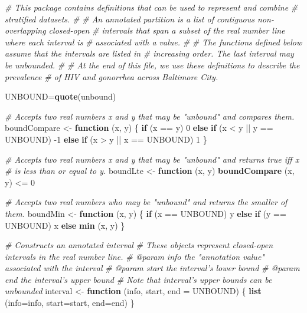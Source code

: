 \documentclass[]{article}
\newenvironment{Shaded}{}{}
\newcommand{\CommentTok}[1]{\textcolor[rgb]{0.38,0.63,0.69}{\textit{#1}}}
\newcommand{\ControlFlowTok}[1]{\textcolor[rgb]{0.00,0.44,0.13}{\textbf{#1}}}
\newcommand{\DataTypeTok}[1]{\textcolor[rgb]{0.56,0.13,0.00}{#1}}
\newcommand{\DecValTok}[1]{\textcolor[rgb]{0.25,0.63,0.44}{#1}}
\newcommand{\KeywordTok}[1]{\textcolor[rgb]{0.00,0.44,0.13}{\textbf{#1}}}
\newcommand{\NormalTok}[1]{#1}
\newcommand{\OperatorTok}[1]{\textcolor[rgb]{0.40,0.40,0.40}{#1}}
\newcommand{\StringTok}[1]{\textcolor[rgb]{0.25,0.44,0.63}{#1}}
\begin{document}
\begin{Shaded}
\begin{Highlighting}[]
\CommentTok{# This package contains definitions that can be used to represent and combine}
\CommentTok{# stratified datasets.}
\CommentTok{#}
\CommentTok{# An annotated partition is a list of contiguous non-overlapping closed-open}
\CommentTok{# intervals that span a subset of the real number line where each interval is}
\CommentTok{# associated with a value.}
\CommentTok{#}
\CommentTok{# The functions defined below assume that the intervals are listed in}
\CommentTok{# increasing order. The last interval may be unbounded.}
\CommentTok{#}
\CommentTok{# At the end of this file, we use these definitions to describe the prevalence}
\CommentTok{# of HIV and gonorrhea across Baltimore City.}

\NormalTok{UNBOUND=}\KeywordTok{quote}\NormalTok{(unbound)}

\CommentTok{# Accepts two real numbers x and y that may be "unbound" and compares them.}
\NormalTok{boundCompare <-}\StringTok{ }\ControlFlowTok{function}\NormalTok{ (x, y) \{}
  \ControlFlowTok{if}\NormalTok{ (x }\OperatorTok{==}\StringTok{ }\NormalTok{y) }\DecValTok{0}
  \ControlFlowTok{else} \ControlFlowTok{if}\NormalTok{ (x }\OperatorTok{<}\StringTok{ }\NormalTok{y }\OperatorTok{||}\StringTok{ }\NormalTok{y }\OperatorTok{==}\StringTok{ }\NormalTok{UNBOUND) }\DecValTok{-1}
  \ControlFlowTok{else} \ControlFlowTok{if}\NormalTok{ (x }\OperatorTok{>}\StringTok{ }\NormalTok{y }\OperatorTok{||}\StringTok{ }\NormalTok{x }\OperatorTok{==}\StringTok{ }\NormalTok{UNBOUND) }\DecValTok{1}
\NormalTok{\}}

\CommentTok{# Accepts two real numbers x and y that may be "unbound" and returns true iff x}
\CommentTok{# is less than or equal to y.}
\NormalTok{boundLte <-}\StringTok{ }\ControlFlowTok{function}\NormalTok{ (x, y) }\KeywordTok{boundCompare}\NormalTok{ (x, y) }\OperatorTok{<=}\StringTok{ }\DecValTok{0}

\CommentTok{# Accepts two real numbers who may be "unbound" and returns the smaller of them.}
\NormalTok{boundMin <-}\StringTok{ }\ControlFlowTok{function}\NormalTok{ (x, y) \{}
  \ControlFlowTok{if}\NormalTok{ (x }\OperatorTok{==}\StringTok{ }\NormalTok{UNBOUND) y}
  \ControlFlowTok{else} \ControlFlowTok{if}\NormalTok{ (y }\OperatorTok{==}\StringTok{ }\NormalTok{UNBOUND) x}
  \ControlFlowTok{else} \KeywordTok{min}\NormalTok{ (x, y)}
\NormalTok{\}}

\CommentTok{# Constructs an annotated interval}
\CommentTok{# These objects represent closed-open intervals in the real number line.}
\CommentTok{# @param info the "annotation value" associated with the interval}
\CommentTok{# @param start the interval's lower bound}
\CommentTok{# @param end the interval's upper bound}
\CommentTok{# Note that interval's upper bounds can be unbounded}
\NormalTok{interval <-}\StringTok{ }\ControlFlowTok{function}\NormalTok{ (info, start, }\DataTypeTok{end =}\NormalTok{ UNBOUND) \{}
  \KeywordTok{list}\NormalTok{ (}\DataTypeTok{info=}\NormalTok{info, }\DataTypeTok{start=}\NormalTok{start, }\DataTypeTok{end=}\NormalTok{end)}
\NormalTok{\}}


\end{Highlighting}
\end{Shaded}
\end{document}

